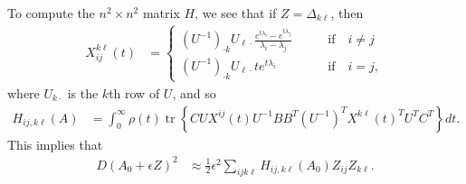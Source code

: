 \documentclass{article}
\newcommand{\tr}{\mathop{\mbox{tr}}} %
\newcommand{\1}{\mathbbm{1}}
\begin{document}
To compute the $n^2 \times n^2$ matrix $H$,
we see that if $Z=\Delta_{k \ell}$, then
\begin{equation}
  \begin{aligned}
    X_{ij}^{k\ell}(t) 
    &= \begin{cases}
      (U^{-1})_{\cdot k} U_{\ell \cdot}
      \frac{ e^{t \lambda_i} - e^{t \lambda_j} }{ \lambda_i - \lambda_j } 
          \qquad & \text{if} \quad i \neq j \\
      (U^{-1})_{\cdot k} U_{\ell \cdot}
      t e^{t \lambda_i} 
          \qquad & \text{if} \quad i = j ,
    \end{cases}
  \end{aligned}
\end{equation}
where $U_{k \cdot}$ is the $k$th row of $U$,
and so
\begin{equation}
    \begin{aligned}
        H_{ij, k\ell}(A)
        &=
        \int_0^\infty
            \rho(t) \tr\left\{ C U X^{ij}(t) U^{-1} B B^T (U^{-1})^T X^{k\ell}(t)^T U^T C^T \right\}
        dt .
    \end{aligned}
\end{equation}
This implies that
\begin{equation}
    \begin{aligned}
        D(A_0+\epsilon Z)^2
        &\approx \frac{1}{2} \epsilon^2 \sum_{ijk\ell} H_{ij,k\ell}(A_0) Z_{ij} Z_{k\ell}  .
    \end{aligned}
\end{equation}

\end{document}
